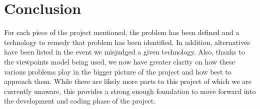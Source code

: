 \documentclass[onecolumn, draftclsnofoot,10pt, compsoc]{IEEEtran}
\begin{document}
\section{Conclusion}
For each piece of the project mentioned, the problem has been defined and a technology to remedy that problem has been identified. In addition, alternatives have been listed in the event we misjudged a given technology. Also, thanks to the viewpoints model being used, we now have greater clarity on how these various problems play in the bigger picture of the project and how best to approach them. While there are likely more parts to this project of which we are currently unaware, this provides a strong enough foundation to move forward into the development and coding phase of the project.
\end{document}

